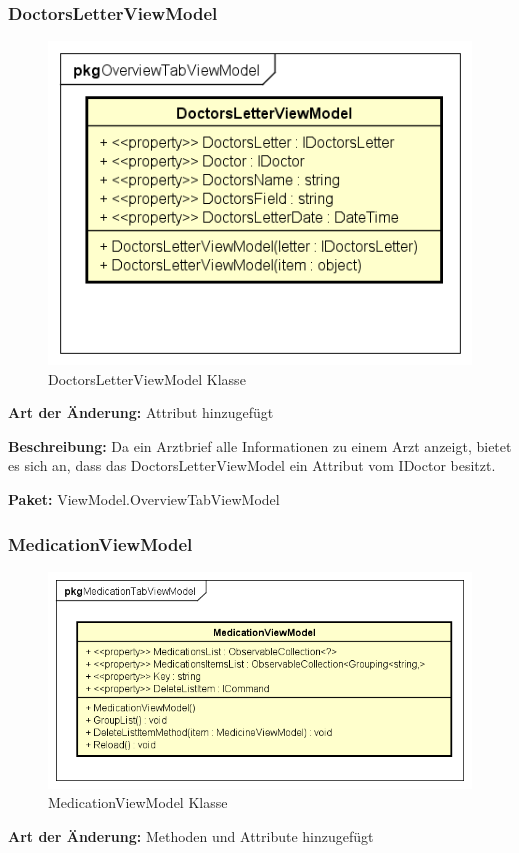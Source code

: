 \documentclass[a4paper]{scrreprt}
\begin{document}
\subsubsection{DoctorsLetterViewModel}
\begin{figure}[H]
\centering
\includegraphics[width=0.45\textheight]{graphics/Klassendiagramme/ViewModel/DoctorsLetterViewModel}
\caption{DoctorsLetterViewModel Klasse}
\end{figure}
\textbf{Art der Änderung:} Attribut hinzugefügt

\textbf{Beschreibung:}  Da ein Arztbrief alle Informationen zu einem Arzt anzeigt, bietet es sich an, dass das DoctorsLetterViewModel ein Attribut vom IDoctor besitzt.

\textbf{Paket:} ViewModel.OverviewTabViewModel

\subsubsection{MedicationViewModel}
\begin{figure}[H]
\centering
\includegraphics[width=0.45\textheight]{graphics/Klassendiagramme/ViewModel/MedicationViewModel}
\caption{MedicationViewModel Klasse}
\end{figure}
\textbf{Art der Änderung:} Methoden und Attribute hinzugefügt
\end{document}
